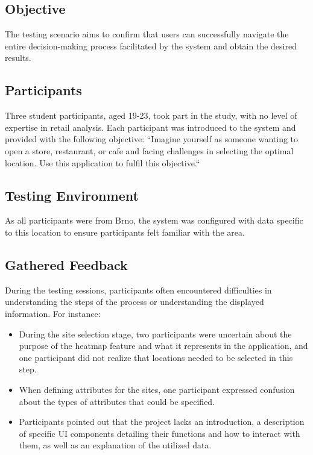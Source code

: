 \subsection{Objective}

The testing scenario aims to confirm that users can successfully navigate the entire decision-making process facilitated by the system and obtain the desired results.

\subsection{Participants}

Three student participants, aged 19-23, took part in the study, with no level of expertise in retail analysis. Each participant was introduced to the system and provided with the following objective: ``Imagine yourself as someone wanting to open a store, restaurant, or cafe and facing challenges in selecting the optimal location. Use this application to fulfil this objective.``

\subsection{Testing Environment}

As all participants were from Brno, the system was configured with data specific to this location to ensure participants felt familiar with the area. 

\subsection{Gathered Feedback}
\label{section:feedback}

During the testing sessions, participants often encountered difficulties in understanding the steps of the process or understanding the displayed information. For instance:

\begin{itemize}
    \item During the site selection stage, two participants were uncertain about the purpose of the heatmap feature and what it represents in the application, and one participant did not realize that locations needed to be selected in this step.
    \item When defining attributes for the sites, one participant expressed confusion about the types of attributes that could be specified.
    \item Participants pointed out that the project lacks an introduction, a description of specific UI components detailing their functions and how to interact with them, as well as an explanation of the utilized data.
\end{itemize}


